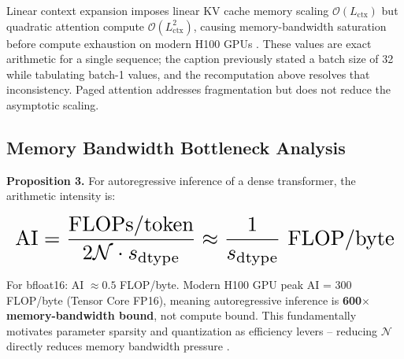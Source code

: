 \documentclass[10pt,journal,compsoc,twocolumn]{IEEEtran}
\begin{document}
Linear context expansion imposes linear KV cache memory scaling $\mathcal{O}(L_{\text{ctx}})$ but quadratic attention compute $\mathcal{O}(L_{\text{ctx}}^2)$, causing memory-bandwidth saturation before compute exhaustion on modern H100 GPUs \cite{arxiv_2501_02497,arxiv_2502_18080}. These values are exact arithmetic for a single sequence; the caption previously stated a batch size of 32 while tabulating batch-1 values, and the recomputation above resolves that inconsistency. Paged attention addresses fragmentation but does not reduce the asymptotic scaling.


\subsection{Memory Bandwidth Bottleneck Analysis}


\textbf{Proposition 3.} For autoregressive inference of a dense transformer, the arithmetic intensity is:



























\begin{equation}
\resizebox{\columnwidth}{!}{$\displaystyle
\begin{aligned}
\text{AI} = \frac{\text{FLOPs/token}}{2\mathcal{N} \cdot s_{\text{dtype}}} \approx \frac{1}{s_{\text{dtype}}} \text{ FLOP/byte}
\end{aligned}
$}
\end{equation}



























For bfloat16: AI $\approx 0.5$ FLOP/byte. Modern H100 GPU peak AI = 300 FLOP/byte (Tensor Core FP16), meaning autoregressive inference is \textbf{600$\times$ memory-bandwidth bound}, not compute bound. This fundamentally motivates parameter sparsity and quantization as efficiency levers -- reducing $\mathcal{N}$ directly reduces memory bandwidth pressure \cite{arxiv_2406_00584}.
\end{document}
